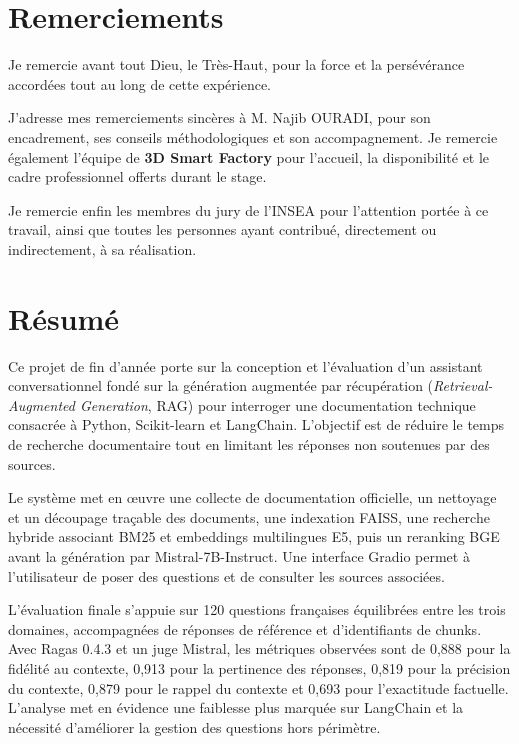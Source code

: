 \documentclass[12pt,a4paper,oneside]{report}
\newcommand{\EncadrantINSEA}{M. Najib OURADI}
\begin{document}
\newpage
\chapter*{Remerciements}
\thispagestyle{plain}
\vspace{1.5cm}
Je remercie avant tout Dieu, le Très-Haut, pour la force et la persévérance
accordées tout au long de cette expérience.

J'adresse mes remerciements sincères à \EncadrantINSEA, pour son encadrement,
ses conseils méthodologiques et son accompagnement. Je remercie également
l'équipe de \textbf{3D Smart Factory} pour l'accueil, la disponibilité et le
cadre professionnel offerts durant le stage.

Je remercie enfin les membres du jury de l'INSEA pour l'attention portée à ce
travail, ainsi que toutes les personnes ayant contribué, directement ou
indirectement, à sa réalisation.

\newpage
\chapter*{Résumé}
\thispagestyle{plain}

Ce projet de fin d'année porte sur la conception et l'évaluation d'un assistant
conversationnel fondé sur la génération augmentée par récupération
(\textit{Retrieval-Augmented Generation}, RAG) pour interroger une documentation
technique consacrée à Python, Scikit-learn et LangChain. L'objectif est de
réduire le temps de recherche documentaire tout en limitant les réponses non
soutenues par des sources.

Le système met en œuvre une collecte de documentation officielle, un nettoyage
et un découpage traçable des documents, une indexation FAISS, une recherche
hybride associant BM25 et embeddings multilingues E5, puis un reranking BGE
avant la génération par Mistral-7B-Instruct. Une interface Gradio permet à
l'utilisateur de poser des questions et de consulter les sources associées.

L'évaluation finale s'appuie sur 120 questions françaises équilibrées entre les
trois domaines, accompagnées de réponses de référence et d'identifiants de
chunks. Avec Ragas 0.4.3 et un juge Mistral, les métriques observées sont de
0,888 pour la fidélité au contexte, 0,913 pour la pertinence des réponses,
0,819 pour la précision du contexte, 0,879 pour le rappel du contexte et 0,693
pour l'exactitude factuelle. L'analyse met en évidence une faiblesse plus
marquée sur LangChain et la nécessité d'améliorer la gestion des questions hors
périmètre.
\end{document}
